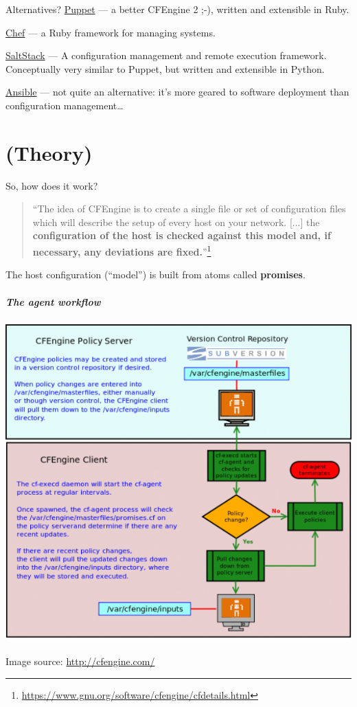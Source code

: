 \documentclass[english,serif,mathserif,usenames,dvipsnames]{beamer}
\begin{document}
\begin{frame}{Alternatives?}
  \href{http://puppetlabs.com/}{Puppet} --- a better CFEngine 2 ;-),
  written and extensible in Ruby.

  \+ \href{https://www.chef.io/chef/}{Chef} --- a Ruby framework for
  managing systems.

  \+ \href{http://saltstack.com/}{SaltStack} --- A configuration
  management and remote execution framework. Conceptually very similar
  to Puppet, but written and extensible in Python.

  \+ \href{http://ansible.cc}{Ansible} --- not quite an alternative:
  it's more geared to software deployment than configuration
  management\ldots
\end{frame}


\part{(Theory)}
\begin{frame}{So, how does it work?}
  \begin{quote}
    ``The idea of CFEngine is to create a single file or set of
    configuration files which will describe the setup of every host on
    your network. [...] the \textbf{configuration of the host is
      checked against this model and, if necessary, any deviations are
      fixed.}''\footnote{%
      \url{https://www.gnu.org/software/cfengine/cfdetails.html}
    }%
  \end{quote}

  \+ The host configuration (``model'') is built from atoms called
  \textbf{promises}.
\end{frame}


\begin{frame}
  \frametitle{The agent workflow}
  \begin{center}
    \includegraphics[height=0.75\textheight]{agent-workflow.png}

    {\footnotesize Image source: \url{http://cfengine.com/}}
  \end{center}
\end{frame}
\end{document}
